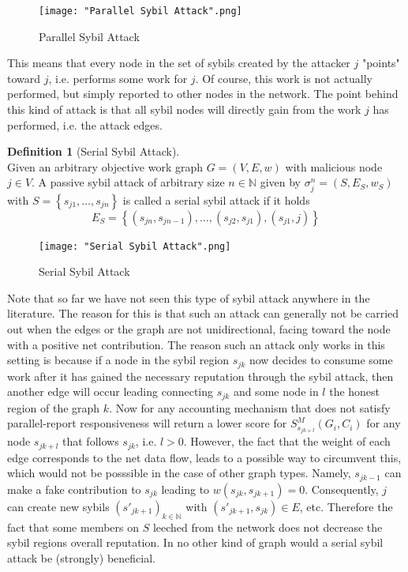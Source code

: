 \documentclass[11pt,a4paper]{report}
\theoremstyle{definition}
\newtheorem{definition}{Definition}[section]
\theoremstyle{theorem}
\theoremstyle{proposition}
\theoremstyle{corollary}
\theoremstyle{lemma}
\theoremstyle{example}
\theoremstyle{remark}
\begin{document}
\begin{figure}[H]
\begin{center}
\texttt{[image: "Parallel Sybil Attack".png]}
\caption{Parallel Sybil Attack}
\label{fig:Parallel Sybil Attack}
\end{center}
\end{figure}

\noindent{}This means that every node in the set of sybils created by the attacker $j$ "points" toward $j$, i.e. performs some work for $j$. Of course, this work is not actually performed, but simply reported to other nodes in the network. The point behind this kind of attack is that all sybil nodes will directly gain from the work $j$ has performed, i.e. the attack edges. \vspace{1em}\\

\begin{definition}[Serial Sybil Attack]\ \\
Given an arbitrary objective work graph $G=(V,E,w)$ with malicious node $j\in{}V$. A passive sybil attack of arbitrary size $n\in\mathbb{N}$ given by $\sigma^n_j=(S,E_S,w_S)$ with $S=\left\lbrace{}s_{j1},\ldots,s_{jn}\right\rbrace$ is called a serial sybil attack if it holds
\[
E_S=\left\lbrace{}(s_{jn},s_{jn-1}),\ldots,(s_{j2},s_{j1}), (s_{j1},j)\right\rbrace
\]
\end{definition}

\begin{figure}[H]
\begin{center}
\texttt{[image: "Serial Sybil Attack".png]}
\caption{Serial Sybil Attack}
\label{fig:Serial Sybil Attack}
\end{center}
\end{figure}

\noindent{}Note that so far we have not seen this type of sybil attack anywhere in the literature. The reason for this is that such an attack can generally not be carried out when the edges or the graph are not unidirectional, facing toward the node with a positive net contribution. The reason such an attack only works in this setting is because if a node in the sybil region $s_{jk}$ now decides to consume some work after it has gained the necessary reputation through the sybil attack, then another edge will occur leading connecting $s_{jk}$ and some node in $l$ the honest region of the graph $k$. Now for any accounting mechanism that does not satisfy parallel-report responsiveness will return a lower score for $S^M_{s_{jk+l}}(G_i,C_i)$ for any node $s_{jk+l}$ that follows $s_{jk}$, i.e. $l>0$. However, the fact that the weight of each edge corresponds to the net data flow, leads to a possible way to circumvent this, which would not be posssible in the case of other graph types. Namely, $s_{jk-1}$ can make a fake contribution to $s_{jk}$ leading to $w(s_{jk},s_{jk+1})=0$. Consequently, $j$ can create new sybils $(s'_{jk+1})_{k\in\mathbb{N}}$ with $(s'_{jk+1},s_{jk})\in{}E$, etc. Therefore the fact that some members on $S$ leeched from the network does not decrease the sybil regions overall reputation. In no other kind of graph would a serial sybil attack be (strongly) beneficial. \vspace{1em}\\ 
\end{document}
